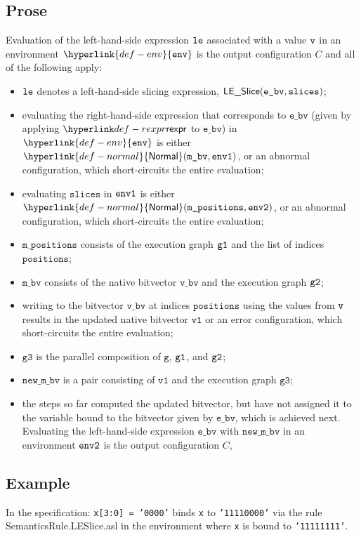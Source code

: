 \documentclass{book}
\newcommand\ProseOrAbnormal[0]{or an abnormal configuration, which short-circuits the entire evaluation}
\newcommand\ProseOrError[0]{or an error configuration, which short-circuits the entire evaluation}
\newcommand\Normal[0]{\hyperlink{def-normal}{\textsf{Normal}}}
\newcommand\env[0]{\hyperlink{def-env}{\texttt{env}}}
\newcommand\vg[0]{\texttt{g}}
\newcommand\vvone[0]{\texttt{v1}}
\newcommand\vgthree[0]{\texttt{g3}}
\newcommand\ebv[0]{\texttt{e\_bv}}
\newcommand\mbv[0]{\texttt{m\_bv}}
\newcommand\vbv[0]{\texttt{v\_bv}}
\newcommand\mpositions[0]{\texttt{m\_positions}}
\newcommand\slices[0]{\texttt{slices}}
\newcommand\positions[0]{\texttt{positions}}
\newcommand\newmbv[0]{\texttt{new\_m\_bv}}
\begin{document}
  \subsection{Prose}
  Evaluation of the left-hand-side expression $\texttt{le}$ associated with a
  value $\texttt{v}$ in an environment $\env$ is the output configuration $C$
  and all of the following apply:
  \begin{itemize}
    \item $\texttt{le}$ denotes a left-hand-side slicing expression, $\LESlice(\ebv, \slices)$;
    \item evaluating the right-hand-side expression that corresponds to $\ebv$
    (given by applying $\torexpr$ to $\ebv$) in $\env$
      is either $\Normal(\mbv,\envone)$, \ProseOrAbnormal;
    \item evaluating $\slices$ in $\texttt{env1}$ is either $\Normal(\mpositions, \envtwo)$,
    \ProseOrAbnormal;
    \item $\mpositions$ consists of the execution graph $\texttt{g1}$ and the list of indices $\positions$;
    \item $\mbv$ consists of the native bitvector $\vbv$ and the execution graph $\texttt{g2}$;
    \item writing to the bitvector $\vbv$ at indices $\positions$ using the values from $\texttt{v}$
    results in the updated native bitvector $\vvone$ \ProseOrError;
    \item $\vgthree$ is the parallel composition of $\vg$, $\texttt{g1}$, and $\texttt{g2}$;
    \item $\newmbv$ is a pair consisting of $\vvone$ and the execution graph $\vgthree$;
    \item the steps so far computed the updated bitvector, but have not assigned it to the
    variable bound to the bitvector given by $\ebv$, which is achieved next.
    Evaluating the left-hand-side expression $\ebv$ with
    $\newmbv$ in an environment $\texttt{env2}$ is the output configuration $C$,
  \end{itemize}

   \subsection{Example}
   In the specification:
   \texttt{x[3:0] = '0000'} binds \texttt{x} to \texttt{'11110000'}
   via the rule SemanticsRule.LESlice.asl
   in the environment where \texttt{x} is bound to \texttt{'11111111'}.
\end{document}
